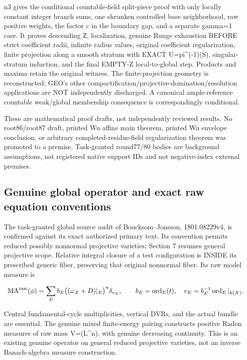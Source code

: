 \documentclass[
  10pt,
]{article}
\begin{document}
n3 gives the conditional countable-field split-piece proof with only
locally constant integer branch sums, one shrunken controlled base
neighborhood, raw positive weights, the factor c in the boundary gap,
and a separate gamma=1 case. It proves descending Z, localization,
genuine Runge exhaustion BEFORE strict coefficient radii, infinite
radius values, original coefficient regularization, finite projection
along a smooth stratum with EXACT U=pi\^{}(-1)(S), singular-stratum
induction, and the final EMPTY-Z local-to-global step. Products and
maxima retain the original witness. The finite-projection geometry is
reconstructed; GEO's other
compactification/projective-domination/resolution applications are NOT
independently discharged. A canonical ample-reference countable
weak/global membership consequence is correspondingly conditional.

These are mathematical proof drafts, not independently reviewed results.
No root86/root87 draft, printed Wu affine main theorem, printed Wu
envelope conclusion, or arbitrary completed-residue-field regularization
theorem was promoted to a premise. Task-granted round77/80 bodies are
background assumptions, not registered native support IDs and not
negative-index external premises.

\subsection{Genuine global operator and exact raw equation
conventions}\label{genuine-global-operator-and-exact-raw-equation-conventions}

The task-granted global source audit of Boucksom--Jonsson, 1801.08229v4,
is confirmed against its exact authorized primary text. Its convention
permits reduced possibly nonnormal projective varieties; Section 7
resumes general projective scope. Relative integral closure of a test
configuration is INSIDE its prescribed generic fiber, preserving that
original nonnormal fiber. Its raw model measure is

\[
 \operatorname{MA}^{\rm raw}(\phi)
 =\sum_E b_E\bigl((\omega_{\mathcal X}+D)|_E\bigr)^n\delta_{v_E},
 \qquad b_E=\operatorname{ord}_E(t),\quad
 v_E=b_E^{-1}\operatorname{ord}_E|_{k(X)}.
\]

Central fundamental-cycle multiplicities, vertical DVRs, and the actual
bundle are essential. The genuine mixed finite-energy pairing constructs
positive Radon measures of raw mass V=(L\^{}n), with genuine decreasing
continuity. This is an existing genuine operator on general reduced
projective varieties, not an inverse Banach-algebra measure
construction.
\end{document}
